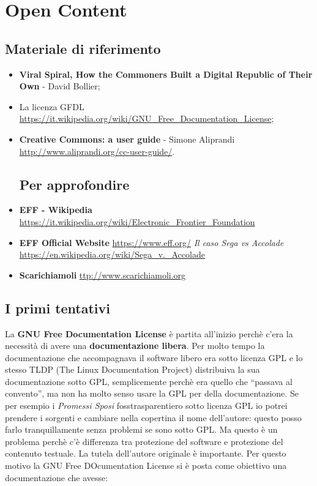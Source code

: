 \section{Open Content}

\subsection*{Materiale di riferimento}

\begin{itemize}

\item \textbf{Viral Spiral, How the Commoners Built a Digital Republic of Their Own} - David Bollier;
\item La licenza GFDL \url{https://it.wikipedia.org/wiki/GNU_Free_Documentation_License};
\item \textbf{Creative Commons: a user guide} - Simone Aliprandi \url{http://www.aliprandi.org/cc-user-guide/}.


\subsection*{Per approfondire}

\item \textbf{EFF - Wikipedia} \url{https://it.wikipedia.org/wiki/Electronic_Frontier_Foundation}
\item \textbf{EFF Official Website} \url{https://www.eff.org/}
\textit{Il caso Sega vs Accolade} \url{https://en.wikipedia.org/wiki/Sega_v._Accolade}
\item \textbf{Scarichiamoli} \url{ttp://www.scarichiamoli.org}
\end{itemize}

\subsection{I primi tentativi}

La \textbf{GNU Free Documentation License} è partita all'inizio perchè c'era la necessità di avere una \textbf{documentazione libera}. Per molto tempo la documentazione che accompagnava il software libero era sotto licenza GPL e lo stesso TLDP (The Linux Documentation Project) distribuiva la sua documentazione sotto GPL, semplicemente perchè era quello che ``passava al convento'', ma non ha molto senso usare la GPL per della documentazione. Se per esempio i \textit{Promessi Sposi} fosstrasparentiero sotto licenza GPL io potrei prendere i sorgenti e cambiare nella copertina il nome dell'autore: questo posso farlo tranquillamente senza problemi se sono sotto GPL. Ma questo è un problema perchè c'è differenza tra protezione del software e protezione del contenuto testuale. La tutela dell'autore originale è importante. Per questo motivo la GNU Free DOcumentation License si è posta come obiettivo una documentazione che avesse:

